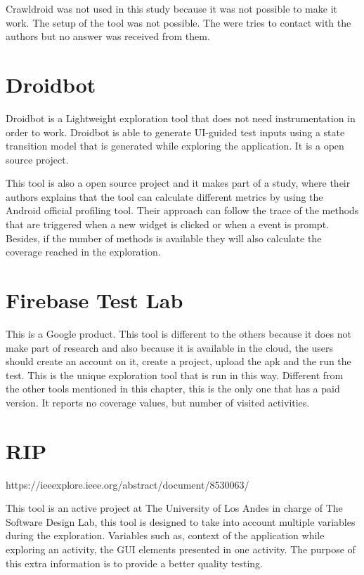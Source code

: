Crawldroid was not used in this study because it was not possible to make it work. The setup of the tool was not possible. The were tries to contact with the authors but no answer was received from them.

\section{Droidbot}
Droidbot is a Lightweight exploration tool that does not need instrumentation in order to work. Droidbot is able to generate UI-guided test inputs using a state transition model that is generated while exploring the application. It is a open source project.

This tool is also a open source project and it makes part of a study, where their authors explains that the tool can calculate different metrics by using the Android official profiling tool. Their approach can follow the trace of the methods that are triggered when a new widget is clicked or when a event is prompt. Besides, if the number of methods is available they will also calculate the coverage reached in the exploration.

\section{Firebase Test Lab}

This is a Google product. This tool is different to the others because it does not make part of research and also because it is available in the cloud, the users should create an account on it, create a project, upload the apk and the run the test. This is the unique exploration tool that is run in this way. Different from the other tools mentioned in this chapter, this is the only one that has a paid version. It reports no coverage values, but number of visited activities.

\section{RIP}
https://ieeexplore.ieee.org/abstract/document/8530063/

This tool is an active project at The University of Los Andes in charge of The Software Design Lab, this tool is designed to take into account multiple variables during the exploration. Variables such as, context of the application while exploring an activity, the GUI elements presented in one activity. The purpose of this extra information is to provide a better quality testing. 


